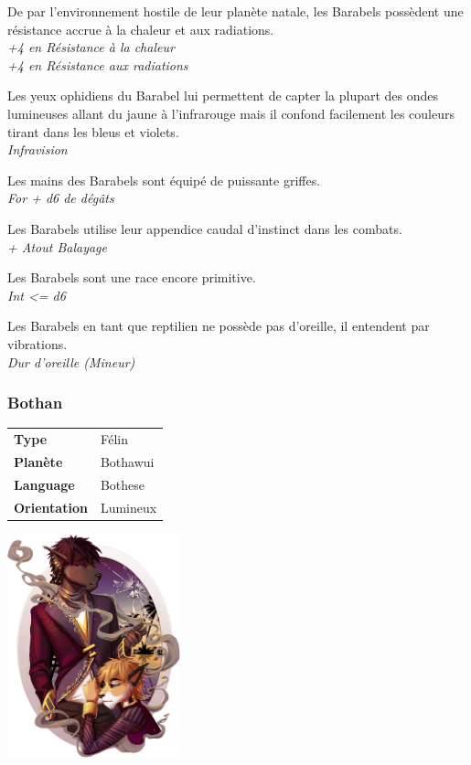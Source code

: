 \begin{description}[align=left]
\item [Enfance difficile] 	%
		De par l'environnement hostile de leur planète natale, les Barabels possèdent une résistance accrue à la chaleur et aux radiations.\\
		\emph{+4 en Résistance à la chaleur}\\
		\emph{+4 en Résistance aux radiations}
\item [\OE{il} Ophidien] 	%
		Les yeux ophidiens du Barabel lui permettent de capter la plupart des ondes lumineuses allant du jaune à l'infrarouge mais il confond facilement les couleurs tirant dans les bleus et violets.\\
		\emph{Infravision}
\item [Arme naturelle]		%
		Les mains des Barabels sont équipé de puissante griffes.\\
		\emph{For + d6 de dégâts}
\item [Balayage]			%
		Les Barabels utilise leur appendice caudal d'instinct dans les combats.\\
		\emph{+ Atout Balayage}
\item [Primitif]			%
		Les Barabels sont une race encore primitive.\\
		\emph{Int <= d6}
\item [Dur d'oreille]		%
		Les Barabels en tant que reptilien ne possède pas d'oreille, il entendent par vibrations.\\
		\emph{Dur d'oreille (Mineur)}
\end{description}


\subsubsection{Bothan}

\begin{flushright}
\begin{tabular}{ l l }
	\textbf{Type} 			& Félin \\
   	\textbf{Planète} 		& Bothawui \\
   	\textbf{Language} 		& Bothese \\
   	\textbf{Orientation} 	& Lumineux \\
\end{tabular}
\end{flushright}

\vspace{-5\baselineskip}
\includegraphics[width=5cm]{img/races/bothan.png}

